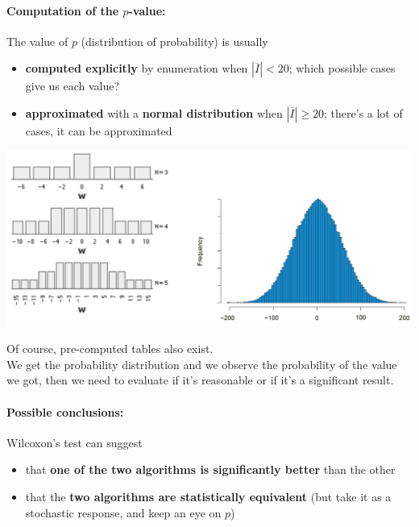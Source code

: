 \documentclass[11pt]{article}
\begin{document}
	\newpage
	
	\paragraph{Computation of the $p$-value:} The value of $p$ (distribution of probability) is usually
	\begin{itemize}
		\item \textbf{computed explicitly} by enumeration when $|\overline{I}| < 20$; which possible cases give us each value?
		\item \textbf{approximated} with a \textbf{normal distribution} when $|\overline{I}| \geq 20$; there's a lot of cases, it can be approximated
	\end{itemize}
	\begin{center}
		\includegraphics[width=\columnwidth]{img/pval1}
	\end{center}
	Of course, pre-computed tables also exist.\\
	
	We get the probability distribution and we observe the probability of the value we got, then we need to evaluate if it's reasonable or if it's a significant result. \\
	
	\newpage
	
	\paragraph{Possible conclusions:} Wilcoxon's test can suggest
	\begin{itemize}
		\item that \textbf{one of the two algorithms is significantly better} than the other
		\item that the \textbf{two algorithms are statistically equivalent} (but take it as a stochastic response, and keep an eye on $p$)
	\end{itemize}
	
\end{document}
